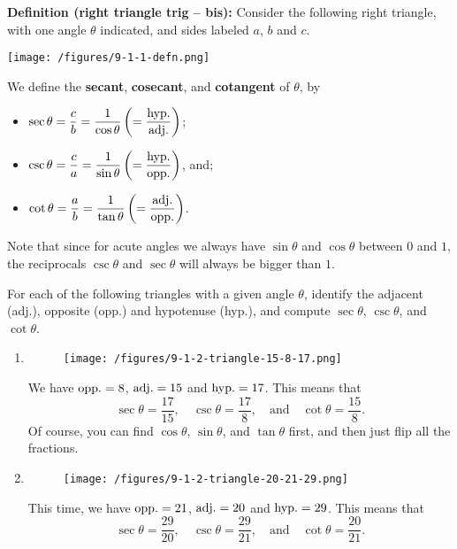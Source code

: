 \documentclass{ximera}
\begin{document}
\begin{callout}
  {\bf Definition (right triangle trig -- bis):} Consider the following right triangle, with one angle $\theta$ indicated, and sides labeled $a$, $b$ and $c$.

  \begin{center}
    \texttt{[image: /figures/9-1-1-defn.png]}
  \end{center}

  
  We define the {\bf secant}, {\bf cosecant}, and {\bf cotangent} of $\theta$, by
  \begin{itemize}
  \item $\displaystyle{\sec\theta = \frac{c}{b} = \frac{1}{\cos\theta} \left(= \frac{\rm hyp.}{\rm adj.}\right)}$;
  \item $\displaystyle{\csc\theta = \frac{c}{a}=\frac{1}{\sin\theta}\left(=\frac{\rm hyp.}{\rm opp.}\right)}$, and;
  \item $\displaystyle{\cot\theta = \frac{a}{b}=\frac{1}{\tan\theta} \left(= \frac{\rm adj.}{\rm opp.}\right)}$.
  \end{itemize}
\end{callout}

Note that since for acute angles we always have $\sin\theta$ and $\cos\theta$ between $0$ and $1$, the reciprocals $\csc\theta$ and $\sec\theta$ will always be bigger than $1$.


\begin{example}
  For each of the following triangles with a given angle $\theta$, identify the adjacent (adj.), opposite (opp.) and hypotenuse (hyp.), and compute $\sec \theta$, $\csc \theta$, and $\cot\theta$.
  \begin{enumerate}[label=\alph*.]
  \item  \begin{figure}[h]
      \centering
      \texttt{[image: /figures/9-1-2-triangle-15-8-17.png]}
    \end{figure}
    \begin{explanation}
      We have ${\rm opp.} = 8$, ${\rm adj.} = 15$ and ${\rm hyp.} = 17$. This means that $$\sec\theta = \frac{17}{15}, \quad \csc \theta =\frac{17}{8}, \quad\mbox{and}\quad \cot\theta =\frac{15}{8}. $$Of course, you can find $\cos \theta$, $\sin \theta$, and $\tan\theta$ first, and then just flip all the fractions.
    \end{explanation}
  \item \begin{figure}[h]
      \centering
      \texttt{[image: /figures/9-1-2-triangle-20-21-29.png]}
    \end{figure}
    \begin{explanation}
      This time, we have ${\rm opp.} = 21$, ${\rm adj.} = 20$ and ${\rm hyp.} = 29$. This means that $$\sec\theta = \frac{29}{20}, \quad \csc \theta =\frac{29}{21}, \quad\mbox{and}\quad \cot\theta =\frac{20}{21}. $$
    \end{explanation}
  \end{enumerate}
\end{example}
\end{document}
